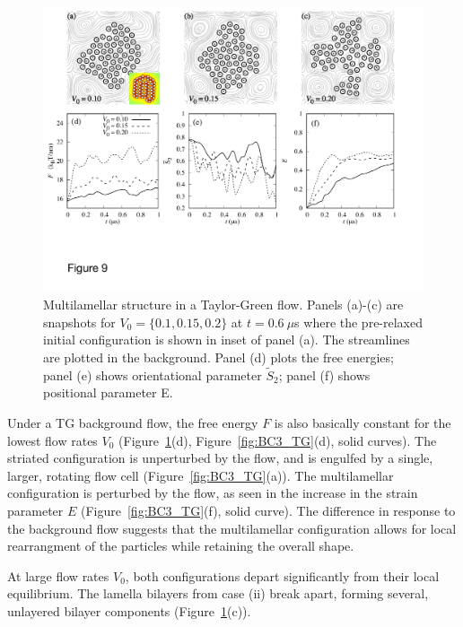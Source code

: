 \documentclass[aps,prl,preprint,groupedaddress]{revtex4-2}
\begin{document}
\begin{figure}
  \begin{center}
\includegraphics[width=1.0\textwidth]{Figures/Figure9.pdf}    
  \end{center}
  \vspace{-20pt}  
  \caption{\label{fig:BC2_TG} 
Multilamellar structure in a Taylor-Green flow. Panels (a)-(c) are snapshots for $V_0 = \{0.1, 0.15, 0.2\}$ at $t=0.6\ \mu$s where the pre-relaxed initial configuration is shown in inset of panel (a). The streamlines are plotted in the background.
Panel (d) plots the free energies; panel (e) shows orientational parameter $\tilde{S}_2$; panel (f) shows positional parameter E.
 }
\end{figure}


Under a TG background flow, the free energy $F$ 
is also basically constant for the lowest flow rates $V_0$
(Figure~\ref{fig:BC2_TG}(d), Figure~\ref{fig:BC3_TG}(d), solid curves).
The striated configuration is unperturbed by the flow, and is engulfed by a single,
larger, rotating flow cell
(Figure~\ref{fig:BC3_TG}(a)). 
The multilamellar configuration is perturbed by the flow, as seen in the increase in
the strain parameter $E$ (Figure~\ref{fig:BC3_TG}(f), solid curve).
The difference in response to the background flow
suggests that the multilamellar configuration
allows for local rearrangment of the particles while retaining the overall shape.

At large flow rates $V_0$, both configurations depart significantly from their local
equilibrium.  The lamella bilayers from case (ii) break apart, forming several,
unlayered bilayer components (Figure~\ref{fig:BC2_TG}(c)).
\end{document}
